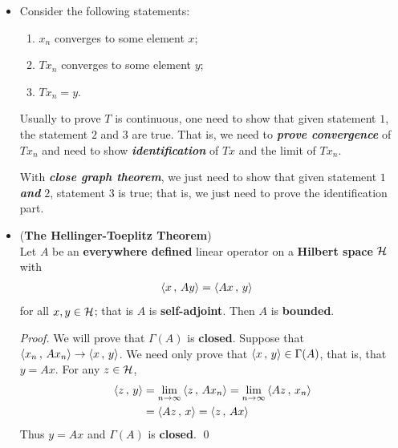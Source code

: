 \documentclass[11pt]{article}
\begin{document}
\begin{itemize}
\item \begin{remark}
Consider the following statements: 
\begin{enumerate}
\item $x_n$ converges to some element $x$;
\item $T x_n$ converges to some element $y$; 
\item $T x_n = y$.
\end{enumerate} 
Usually to prove $T$ is continuous, one need to show that given statement $1$, the statement $2$ and $3$ are true. That is, we need to \emph{\textbf{prove convergence}} of $T x_n$ and need to show \emph{\textbf{identification}} of $T x$ and the limit of $T x_n$.

With \emph{\textbf{close graph theorem}}, we just need to show that given statement $1$ \emph{\textbf{and}} $2$, statement $3$ is true; that is, we just need to prove the identification part.
\end{remark}

\item \begin{corollary}(\textbf{The Hellinger-Toeplitz Theorem}) \citep{reed1980methods} \\
Let $A$ be an \textbf{everywhere defined} linear operator on a \textbf{Hilbert space} ${\mathcal H}$ with
\begin{align*}
\left\langle x\,,\, Ay \right\rangle &= \left\langle Ax\,,\, y \right\rangle
\end{align*} for all $x, y \in {\mathcal H}$; that is $A$ is \textbf{self-adjoint}. Then $A$ is \textbf{bounded}. 
\begin{proof}
We will prove that $\Gamma(A)$ is \textbf{closed}. Suppose that $\left\langle x_n\,,\, Ax_n \right\rangle \rightarrow \left\langle x\,,\, y \right\rangle$. 
We need only prove that $\left\langle x\,,\, y \right\rangle \in \Gamma(A)$, that is, that $y = Ax$. For any $z \in {\mathcal H}$,
\begin{align*}
\left\langle z\,,\, y \right\rangle &= \lim\limits_{n \rightarrow \infty}\left\langle z\,,\, Ax_n \right\rangle = \lim\limits_{n \rightarrow \infty}\left\langle Az\,,\, x_n \right\rangle\\
&= \left\langle Az\,,\, x \right\rangle = \left\langle z\,,\, Ax \right\rangle
\end{align*}
Thus $y = Ax$ and $\Gamma(A)$ is \textbf{closed}. \qed
\end{proof}
\end{corollary}
\end{itemize}

\newpage


\end{document}
